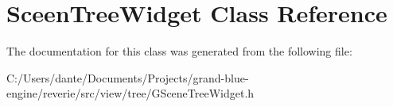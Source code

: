\hypertarget{class_sceen_tree_widget}{}\section{Sceen\+Tree\+Widget Class Reference}
\label{class_sceen_tree_widget}


The documentation for this class was generated from the following file\+:\begin{DoxyCompactItemize}
\item 
C\+:/\+Users/dante/\+Documents/\+Projects/grand-\/blue-\/engine/reverie/src/view/tree/G\+Scene\+Tree\+Widget.\+h\end{DoxyCompactItemize}

